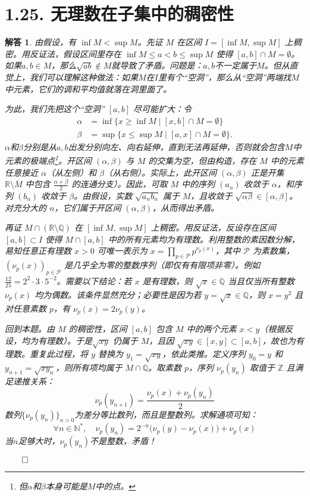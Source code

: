 \documentclass[12pt,UTF8]{ctexbook}
\theoremstyle{exercisestyle}
\theoremstyle{solutionstyle}
\newtheorem*{solution*}{解答}
\newenvironment{solution}
  {\begin{solution*}}
  {\hfill\ensuremath{\qed}\end{solution*}}
\begin{document}
\section{1.25. 无理数在子集中的稠密性}
\begin{solution}
  由假设，有 \( \inf M < \sup M \)。先证 \( M \) 在区间 \( I = [\inf M, \sup M] \) 上稠密。用反证法，假设区间里存在 \( \inf M \leqslant a < b \leqslant \sup M \) 使得 \( [a, b] \cap M = \emptyset \)。如果$a,b\in M$，那么$\sqrt{ab}\notin M$就导致了矛盾。问题是：$a,b$不一定属于$M$。但从直觉上，我们可以理解这种做法：如果$M$在$I$里有个“空洞”，那么从“空洞”两端找$M$中元素，它们的调和平均值就落在洞里面了。
  
  为此，我们先把这个“空洞” \( [a, b] \) 尽可能扩大：令
  \begin{align*}
  \alpha &= \inf \{ x \geqslant \inf M \mid [x, b] \cap M = \emptyset \} \\
  \beta &= \sup \{ x \leqslant \sup M \mid [a, x] \cap M = \emptyset \}.
  \end{align*}
  $\alpha$和$\beta$分别是从$a, b$出发分别向左、向右延伸，直到无法再延伸，否则就会包含$M$中元素的极端点\footnote{但$\alpha$和$\beta$本身可能是$M$中的点。}。开区间 \( (\alpha, \beta) \) 与 \( M \) 的交集为空，但由构造，存在 \( M \) 中的元素任意接近 \( \alpha \)（从左侧）和 \( \beta \)（从右侧）。实际上，此开区间 \( (\alpha, \beta) \) 正是开集 \( \mathbb{R} \setminus \overline{M} \) 中包含 \( \frac{\alpha + \beta}{2} \) 的连通分支）。因此，可取 \( M \) 中的序列 \( (a_n) \) 收敛于 \( \alpha \)，和序列 \( (b_n) \) 收敛于 \( \beta \)。由假设，实数 \( \sqrt{a_n b_n} \) 属于 \( M \)，且收敛于 \( \sqrt{\alpha \beta} \in [\alpha, \beta] \)。对充分大的 \( n \)，它们属于开区间 \( (\alpha, \beta) \)，从而得出矛盾。

  再证 \( M \cap (\mathbb{R} \setminus \mathbb{Q}) \) 在 \( [\inf M, \sup M] \) 上稠密。用反证法，反设存在区间 \( [a, b] \subset I \) 使得 \( M \cap [a, b] \) 中的所有元素均为有理数。利用整数的素因数分解，易知任意正有理数 \( x > 0 \) 可唯一表示为 \( x = \prod_{p \in \mathcal{P}} p^{\nu_p(x)} \)，其中 \( \mathcal{P} \) 为素数集，\( (\nu_p(x))_{p \in \mathcal{P}} \) 是几乎全为零的整数序列（即仅有有限项非零）。例如 \( \frac{12}{25} = 2^2 \cdot 3 \cdot 5^{-2} \)。需要以下结论：若 \( x \) 是有理数，则 \( \sqrt{x} \in \mathbb{Q} \) 当且仅当所有整数 \( \nu_p(x) \) 均为偶数。该条件显然充分；必要性是因为若 \( y = \sqrt{x} \in \mathbb{Q} \)，则 \( x = y^2 \) 且对任意素数 \( p \)，有 \( \nu_p(x) = 2\nu_p(y) \)。

  回到本题。由 \( M \) 的稠密性，区间 \( [a, b] \) 包含 \( M \) 中的两个元素 \( x < y \)（根据反设，均为有理数）。于是\( \sqrt{xy} \) 仍属于 \( M \)，且因 \( \sqrt{xy} \in [x, y] \subset [a, b] \)，故也为有理数。重复此过程，将 \( y \) 替换为 \( y_1 = \sqrt{xy} \)，依此类推。定义序列 \( y_0 = y \) 和 \( y_{n+1} = \sqrt{x y_n} \)，则所有项均属于 \( M \cap \mathbb{Q} \)。取素数 \( p \)，序列 \( \nu_p(y_n) \) 取值于 \( \mathbb{Z} \) 且满足递推关系：
  \[ \nu_p(y_{n+1}) = \frac{\nu_p(x) + \nu_p(y_n)}{2} \]
  数列$\{\nu_p(y_n)\}_{n>0}$为差分等比数列，而且是整数列。求解通项可知：
  \[\forall n\in \mathbb{N}^*, \quad \nu_p(y_n) = 2^{-n}\big(\nu_p(y) - \nu_p(x)\big) + \nu_p(x) \]
  当$n$足够大时，$\nu_p(y_n)$不是整数，矛盾！


\end{solution}
\end{document}
